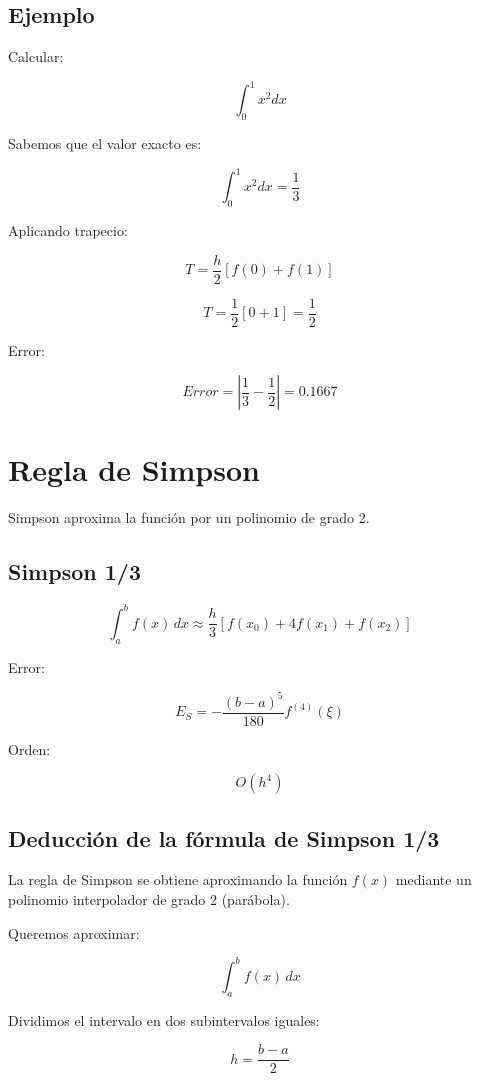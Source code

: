 \documentclass[12pt,a4paper]{article}
\begin{document}
\subsection{Ejemplo}

Calcular:

\[
\int_0^1 x^2 dx
\]

Sabemos que el valor exacto es:

\[
\int_0^1 x^2 dx = \frac{1}{3}
\]

Aplicando trapecio:

\[
T = \frac{h}{2} [f(0) + f(1)]
\]

\[
T = \frac{1}{2} [0 + 1] = \frac{1}{2}
\]

Error:

\[
Error = \left| \frac{1}{3} - \frac{1}{2} \right| = 0.1667
\]




\newpage

\section{Regla de Simpson}

Simpson aproxima la función por un polinomio de grado 2.

\subsection{Simpson 1/3}

\[
\int_a^b f(x)\,dx \approx \frac{h}{3} \left[f(x_0) + 4f(x_1) + f(x_2)\right]
\]

Error:

\[
E_S = -\frac{(b-a)^5}{180} f^{(4)}(\xi)
\]

Orden:

\[
O(h^4)
\]



\subsection{Deducción de la fórmula de Simpson 1/3}

La regla de Simpson se obtiene aproximando la función $f(x)$ mediante un 
polinomio interpolador de grado 2 (parábola).

Queremos aproximar:

\[
\int_a^b f(x)\,dx
\]

Dividimos el intervalo en dos subintervalos iguales:

\[
h = \frac{b-a}{2}
\]
\end{document}
